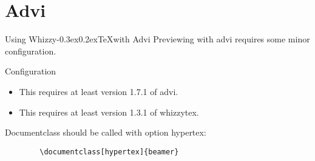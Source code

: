 \documentclass[compress]{beamer}
\makeatletter
\def \WhizzyTeX {{Whizzy\kern -0.3ex\raise 0.2ex\hbox{\let \@\relax\TeX}}}
\makeatother
\begin{document}
\section{Advi}
\begin{frame}{Using \WhizzyTeX with Advi}
Previewing with advi requires some minor configuration. 
\end{frame}
\begin{frame}[fragile=singleslide]{Configuration}
\begin{itemize}
\item This requires at least version 1.7.1 of advi.
\item This requires at least version 1.3.1 of whizzytex. 
\end{itemize}
Documentclass should be called with option hypertex:
\begin{verbatim}
        \documentclass[hypertex]{beamer}
\end{verbatim}
\end{frame}
\end{document}
